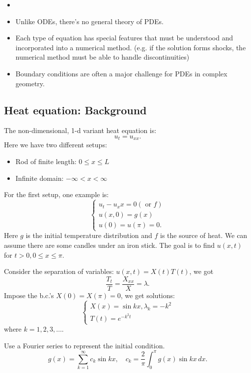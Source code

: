 \begin{note}
    \begin{itemize}
        \item []
        \item Unlike ODEs, there's no general theory of PDEs. 
        \item Each type of equation has special features that must be understood and incorporated into a numerical method. (e.g. if the solution forms shocks, the numerical method must be able to handle discontinuities) 
        \item Boundary conditions are often a major challenge for PDEs  in complex geometry. 
    \end{itemize}
\end{note}

\subsection{Heat equation: Background} 
The non-dimensional, 1-d variant heat equation is: 
\[
    u_t = u_{xx}. 
\]
Here we  have two different setups: 
\begin{itemize}
    \item Rod of finite length: $0\le x\le L$ 
    \item Infinite domain: $ -\infty<x < \infty $ 
\end{itemize}

For the first setup, one example is: 
\[
    \begin{cases}
        u_t - u_xx = 0 (\text{ or } f) \\ 
        u(x,0) = g(x) \\ 
        u(0) = u(\pi) = 0. 
    \end{cases}
\]
Here $g$ is the initial temperature distribution and $f$ is the source of heat. We can assume there are some candles under an iron stick. The goal is to find $u(x,t)$ for $t>0,0\le x\le \pi $.  

Consider the separation of variables: $u(x,t) = X(t) T(t)$, we got 
\[
    \frac{T_t}{T}= \frac{X_{xx}}{X}=\lambda. 
\]
Impose the b.c.'s $X(0) = X(\pi) = 0$, we get solutions: 
\[
    \begin{cases}
        X(x) = \sin kx, \lambda_k = -k^2 \\ 
        T(t) = e^{-k^2t}
    \end{cases}
\]
where $k=1,2,3,\ldots $.  


\begin{definition}
[superposition]
\label{def: superposition}
Use a Fourier series to represent the initial condition.  
\[
    g(x) = \sum_{k=1}^{\infty} c_k \sin k x, \quad c_k = \frac{2}{\pi }\int_0^\pi  g(x) \sin k x\, dx.   
\]
\end{definition}

